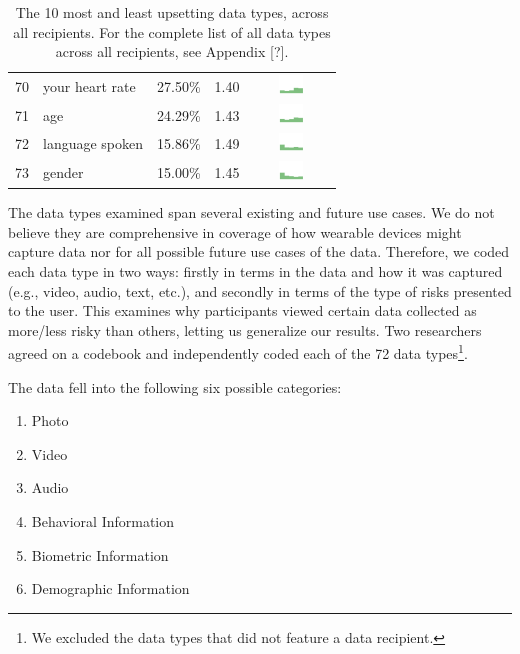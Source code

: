 \begin{table}[t]
\begin{center}
\begin{tabular}{| r | l | r | r |c |}
70 & your heart rate & 27.50\% & 1.40 & \includegraphics[width = 2cm, height = 0.5cm]{tex-inputs/data10/learnedyourheartratecombined} \\
71 & age & 24.29\% & 1.43 & \includegraphics[width = 2cm, height = 0.5cm]{tex-inputs/data10/learnedyouragecombined}\\
72 & language spoken & 15.86\% & 1.49 & \includegraphics[width = 2cm, height = 0.5cm]{tex-inputs/data10/learnedthelanguageyouwerespeakingcombined}\\
73 & gender & 15.00\% & 1.45 & \includegraphics[width = 2cm, height = 0.5cm]{tex-inputs/data10/learnedyourgendercombined}\\ 
\hline
\end{tabular}
\caption{The 10 most and least upsetting data types, across all recipients. For the complete list of all data types across all recipients, see Appendix [?].}
\label{top10-table}
\end{center}
\end{table}

The data types examined span several existing and future use cases. We do not believe they are comprehensive in coverage of how wearable devices might capture data nor for all possible future use cases of the data. Therefore, we coded each data type in two ways: firstly in terms in the data and how it was captured (e.g., video, audio, text, etc.), and  secondly in terms of the type of risks presented to the user. This examines why participants viewed certain data collected as more/less risky than others, letting us  generalize our results. Two researchers agreed on a codebook and independently coded each of the 72 data types\footnote{We excluded the data types that did not feature a data recipient.}.

The data fell into the following six possible categories:
\begin{enumerate}[topsep=0pt,itemsep=-1ex,partopsep=1ex,parsep=1ex]
\item Photo
\item Video
\item Audio
\item Behavioral Information
\item Biometric Information
\item Demographic Information
\end{enumerate}

